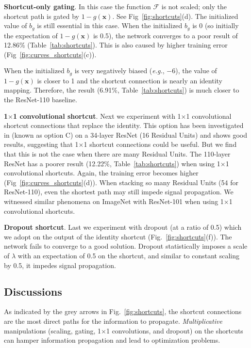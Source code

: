 \documentclass[runningheads]{llncs}
\def\eg{\emph{e.g.}}
\newcommand{\ve}[1]{\mathbf{#1}} %
\begin{document}
\textbf{Shortcut-only gating}. In this case the function $\mathcal{F}$ is not scaled; only the shortcut path is gated by $1-g(\ve{x})$. See Fig~\ref{fig:shortcuts}(d). The initialized value of $b_g$ is still essential in this case. When the initialized $b_g$ is 0 (so initially the expectation of $1-g(\ve{x})$ is 0.5), the network converges to a poor result of 12.86\% (Table~\ref{tab:shortcuts}). This is also caused by higher training error (Fig~\ref{fig:curves_shortcuts}(c)).

When the initialized $b_g$ is very negatively biased (\eg, $-6$), the value of $1-g(\ve{x})$ is closer to 1 and the shortcut connection is nearly an identity mapping. Therefore, the result (6.91\%, Table~\ref{tab:shortcuts}) is much closer to the ResNet-110 baseline.

\textbf{1$\times$1 convolutional shortcut}. Next we experiment with 1$\times$1 convolutional shortcut connections that replace the identity. This option has been investigated in \cite{He2016} (known as option C) on a 34-layer ResNet (16 Residual Units) and shows good results, suggesting that 1$\times$1 shortcut connections could be useful. But we find that this is not the case when there are many Residual Units. The 110-layer ResNet has a poorer result (12.22\%, Table~\ref{tab:shortcuts}) when using 1$\times$1 convolutional shortcuts. Again, the training error becomes higher (Fig~\ref{fig:curves_shortcuts}(d)). When stacking so many Residual Units (54 for ResNet-110), even the shortest path may still impede signal propagation. We witnessed similar phenomena on ImageNet with ResNet-101 when using 1$\times$1 convolutional shortcuts.

\textbf{Dropout shortcut}. Last we experiment with dropout \cite{Hinton2012} (at a ratio of 0.5) which we adopt on the output of the identity shortcut (Fig.~\ref{fig:shortcuts}(f)). The network fails to converge to a good solution. Dropout statistically imposes a scale of $\lambda$ with an expectation of 0.5 on the shortcut, and similar to constant scaling by 0.5, it impedes signal propagation.

\subsection{Discussions}

As indicated by the grey arrows in Fig.~\ref{fig:shortcuts}, the shortcut connections are the most direct paths for the information to propagate. \emph{Multiplicative} manipulations (scaling, gating, 1$\times$1 convolutions, and dropout) on the shortcuts can hamper information propagation and lead to optimization problems.
\end{document}
